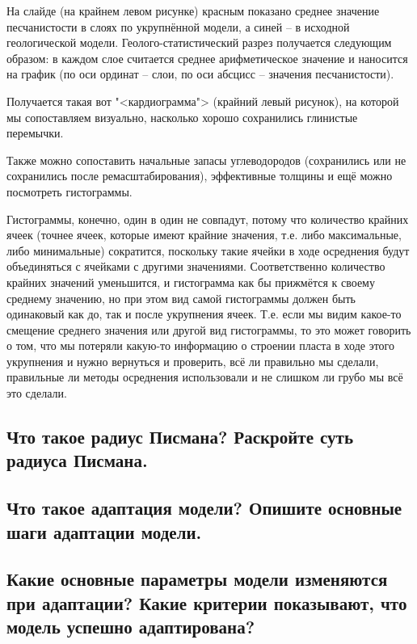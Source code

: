\documentclass[main.tex]{subfiles}
\begin{document}
На слайде (на крайнем левом рисунке) красным показано среднее значение песчанистости в слоях по укрупнённой модели, а синей -- в исходной геологической модели.
Геолого-статистический разрез получается следующим образом: в каждом слое считается среднее арифметическое значение и наносится на график (по оси ординат -- слои, по оси абсцисс -- значения песчанистости).

Получается такая вот "<кардиограмма"> (крайний левый рисунок), на которой мы сопоставляем визуально, насколько хорошо сохранились глинистые перемычки.

Также можно сопоставить начальные запасы углеводородов (сохранились или не сохранились после ремасштабирования), эффективные толщины и ещё можно посмотреть гистограммы.

Гистограммы, конечно, один в один не совпадут, потому что количество крайних ячеек (точнее ячеек, которые имеют крайние значения, т.е. либо максимальные, либо минимальные) сократится, поскольку такие ячейки в ходе осреднения будут объединяться с ячейками с другими значениями.
Соответственно количество крайних значений уменьшится, и гистограмма как бы прижмётся к своему среднему значению, но при этом вид самой гистограммы должен быть одинаковый как до, так и после укрупнения ячеек.
Т.е. если мы видим какое-то смещение среднего значения или другой вид гистограммы, то это может говорить о том, что мы потеряли какую-то информацию о строении пласта в ходе этого укрупнения и нужно вернуться и проверить, всё ли правильно мы сделали, правильные ли методы осреднения использовали и не слишком ли грубо мы всё это сделали.

\newpage

\subsection{Что такое радиус Писмана? Раскройте суть радиуса Писмана.}

\newpage

\subsection{Что такое адаптация модели? Опишите основные шаги адаптации модели.}

\newpage

\subsection{Какие основные параметры модели изменяются при адаптации? Какие критерии показывают, что модель успешно адаптирована?}
\end{document}
